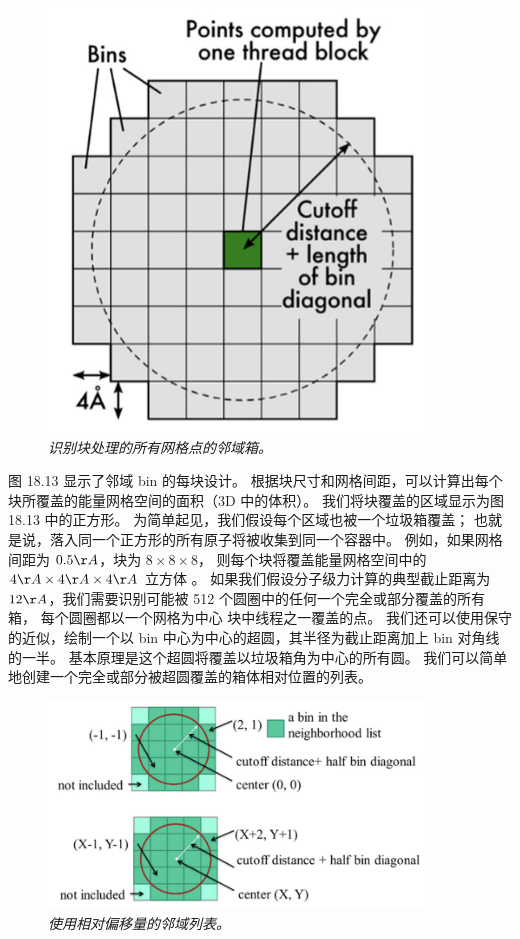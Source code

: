 \begin{figure}[H]
	\centering
	\includegraphics[width=0.9\textwidth]{figs/F18.13.png}
	\caption{\textit{识别块处理的所有网格点的邻域箱。}}
\end{figure}

图 18.13 显示了邻域 bin 的每块设计。 根据块尺寸和网格间距，可以计算出每个块所覆盖的能量网格空间的面积（3D 中的体积）。 
我们将块覆盖的区域显示为图 18.13 中的正方形。 为简单起见，我们假设每个区域也被一个垃圾箱覆盖； 
也就是说，落入同一个正方形的所有原子将被收集到同一个容器中。 
例如，如果网格间距为 $0.5 \AA$，块为 $8 \times 8 \times 8$，
则每个块将覆盖能量网格空间中的 $4 \AA \times 4 \AA \times 4 \AA$ 立方体 。 
如果我们假设分子级力计算的典型截止距离为 $12 \AA$，我们需要识别可能被 512 个圆圈中的任何一个完全或部分覆盖的所有箱，
每个圆圈都以一个网格为中心 块中线程之一覆盖的点。 
我们还可以使用保守的近似，绘制一个以 bin 中心为中心的超圆，其半径为截止距离加上 bin 对角线的一半。 
基本原理是这个超圆将覆盖以垃圾箱角为中心的所有圆。 我们可以简单地创建一个完全或部分被超圆覆盖的箱体相对位置的列表。

\begin{figure}[H]
	\centering
	\includegraphics[width=0.9\textwidth]{figs/F18.14.png}
	\caption{\textit{使用相对偏移量的邻域列表。}}
\end{figure}

